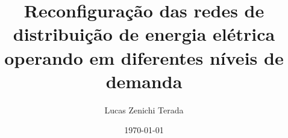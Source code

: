 \documentclass[ABNT, FAPESP]{zentera}
\author{Lucas Zenichi Terada}
\title{Reconfiguração das redes de distribuição de energia elétrica operando em diferentes níveis de demanda}
\date{\today}
\begin{document}
\makecover










\end{document}
